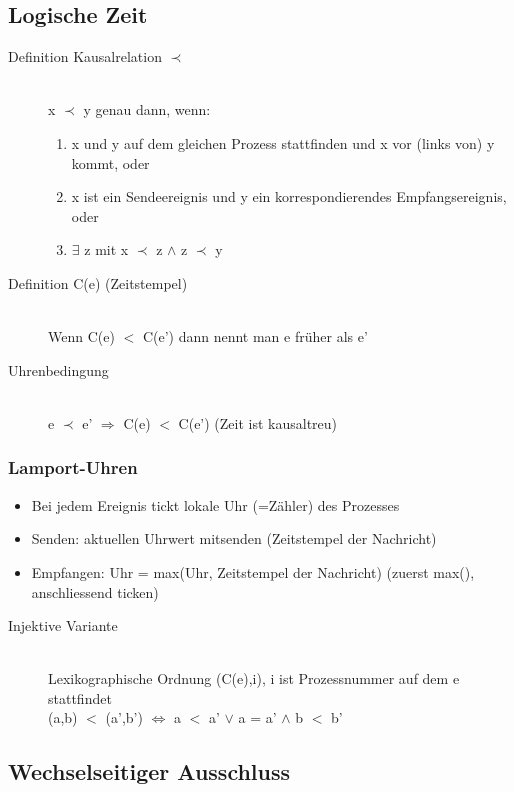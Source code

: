 \documentclass[10pt,a4paper]{article}
\begin{document}
\subsection{Logische Zeit}
\begin{description}
\item[Definition Kausalrelation $\prec$]\hfill\\
x $\prec$ y genau dann, wenn:
\begin{enumerate}[topsep=-100ex]
\item x und y auf dem gleichen Prozess stattfinden und x vor (links von) y kommt, oder
\item x ist ein Sendeereignis und y ein korrespondierendes Empfangsereignis, oder
\item $\exists$ z mit x $\prec$ z $\wedge$ z $\prec$ y
\end{enumerate}
\item[Definition C(e) (Zeitstempel)]\hfill\\
Wenn C(e) $<$ C(e') dann nennt man e früher als e'
\item[Uhrenbedingung]\hfill\\
e $\prec$ e' $\Rightarrow$ C(e) $<$ C(e') (Zeit ist kausaltreu)
\end{description}

\subsubsection{Lamport-Uhren}
\begin{itemize}
\item Bei jedem Ereignis tickt lokale Uhr (=Zähler) des Prozesses
\item Senden: aktuellen Uhrwert mitsenden (Zeitstempel der Nachricht)
\item Empfangen: Uhr = max(Uhr, Zeitstempel der Nachricht) (zuerst max(), anschliessend ticken)
\end{itemize}

\begin{description}
\item[Injektive Variante]\hfill\\
Lexikographische Ordnung (C(e),i), i ist Prozessnummer auf dem e stattfindet\\
(a,b) $<$ (a',b') $\Leftrightarrow$ a $<$ a' $\vee$ a = a' $\wedge$ b $<$ b'
\end{description}


\subsection{Wechselseitiger Ausschluss}
\end{document}
